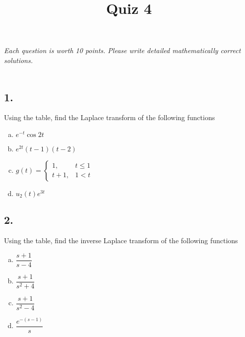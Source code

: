 

\usepackage{multicol}


\title{Quiz 4}


\maketitle

\thispagestyle{fancy}





\emph{Each question is worth 10 points. Please write detailed mathematically correct solutions.}\\\\





\subsection*{1. }
Using the table, find the Laplace transform of the following functions
\begin{multicols}{2}
	\begin{enumerate}[a)]
		\item $ e^{-t} \cos 2t$ \\
		\item $e^{2t}(t-1)(t-2)$
		\item $ g(t) = \begin{cases} 1, & t \le 1 \\ t+1, & 1 < t \end{cases}$\\
		\item $u_2(t)e^{3t}$
	\end{enumerate}
\end{multicols}
\vspace{2em}

\subsection*{2. }
Using the table, find the inverse Laplace transform of the following functions
\begin{multicols}{2}
	\begin{enumerate}[a)]
		\item $\dfrac{s+1}{s - 4}$\\
		\item $\dfrac{s+1}{s^2 + 4}$
		\item $\dfrac{s+1}{s^2 - 4}$\\
		\item $\dfrac{e^{-(s-1)}}{s}$
	\end{enumerate}
\end{multicols}
\vspace{2em}


